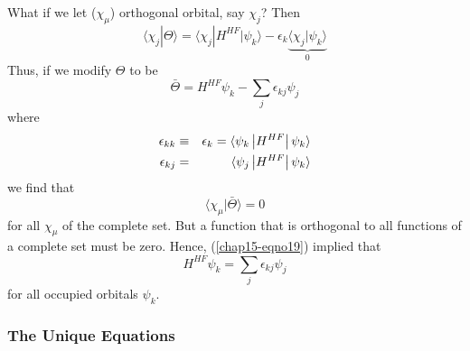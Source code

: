 What if we let ($\chi_{\mu}$) orthogonal orbital, say $\chi_j$? Then
\begin{equation}
\langle \chi_j | \Theta \rangle = \langle \chi_j | H^{HF} | \psi_k 
\rangle - \epsilon_k \underbrace{\langle \chi_j | \psi_k \rangle}_{0}
\end{equation}
Thus, if we modify $\Theta$ to be
\begin{equation}
{\bar{\Theta}} = H^{HF} \psi_k - \sum_{j} \epsilon_{kj} \psi_j
\end{equation}
where
\begin{eqnarray}
\epsilon_{kk} & \equiv &\epsilon_k = \langle \psi_k \left| H^{HF} 
\right| \psi_k 
\rangle\cr
\epsilon_{kj} & = &\langle \psi_j \left| H^{HF} \right| \psi_k \rangle
\label{chap15-eqno18}
\end{eqnarray}
we find that
\begin{equation}
\langle \chi_{\mu} | {\bar{\Theta}} \rangle = 0
\label{chap15-eqno19}
\end{equation}
for all $\chi_{\mu}$ of the complete set.  But a function that is
orthogonal to all functions of a complete set must be zero.  Hence,
(\ref{chap15-eqno19}) implied that
\begin{equation}
H^{HF} \psi_k = \sum_{j} \epsilon_{kj} \psi_j
\label{chap15-eqno20}
\end{equation}
for all occupied orbitals $\psi_k$.

\subsubsection{The Unique Equations}

